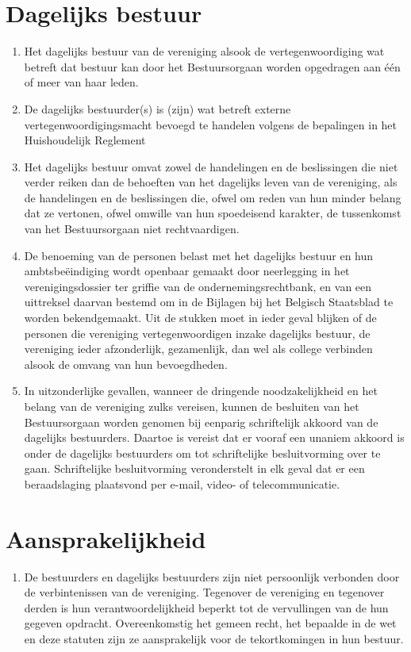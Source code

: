     \section{Dagelijks bestuur}
    \begin{enumerate}
    \item Het dagelijks bestuur van de vereniging alsook de vertegenwoordiging wat betreft dat bestuur kan door het Bestuursorgaan worden opgedragen aan één of meer van haar leden.
    \item De dagelijks bestuurder(s) is (zijn) wat betreft externe vertegenwoordigingsmacht bevoegd te handelen volgens de bepalingen in het Huishoudelijk Reglement
    \item Het dagelijks bestuur omvat zowel de handelingen en de beslissingen die niet verder reiken dan de behoeften van het dagelijks leven van de vereniging, als de handelingen en de beslissingen die, ofwel om reden van hun minder belang dat ze vertonen, ofwel omwille van hun spoedeisend karakter, de tussenkomst van het Bestuursorgaan niet rechtvaardigen.
    \item De benoeming van de personen belast met het dagelijks bestuur en hun ambtsbeëindiging wordt openbaar gemaakt door neerlegging in het verenigingsdossier ter griffie van de ondernemingsrechtbank, en van een uittreksel daarvan bestemd om in de Bijlagen bij het Belgisch Staatsblad te worden bekendgemaakt. Uit de stukken moet in ieder geval blijken of de personen die vereniging vertegenwoordigen inzake dagelijks bestuur, de vereniging ieder afzonderlijk, gezamenlijk, dan wel als college verbinden alsook de omvang van hun bevoegdheden.
    \item In uitzonderlijke gevallen, wanneer de dringende noodzakelijkheid en het belang van de vereniging zulks vereisen, kunnen de besluiten van het Bestuursorgaan worden genomen bij eenparig schriftelijk akkoord van de dagelijks bestuurders. Daartoe is vereist dat er vooraf een unaniem akkoord is onder de dagelijks bestuurders om tot schriftelijke besluitvorming over te gaan. Schriftelijke besluitvorming veronderstelt in elk geval dat er een beraadslaging plaatsvond per e-mail, video- of telecommunicatie.
    \end{enumerate}
    
    \section{Aansprakelijkheid}
    \begin{enumerate}
    \item De bestuurders en dagelijks bestuurders zijn niet persoonlijk verbonden door de verbintenissen van de vereniging. Tegenover de vereniging en tegenover derden is hun verantwoordelijkheid beperkt tot de vervullingen van de hun gegeven opdracht. Overeenkomstig het gemeen recht, het bepaalde in de wet en deze statuten zijn ze aansprakelijk voor de tekortkomingen in hun bestuur.
    \end{enumerate}


